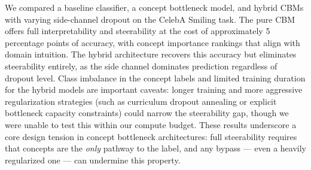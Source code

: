\documentclass[11pt,a4paper]{article}
\begin{document}
We compared a baseline classifier, a concept bottleneck model, and hybrid CBMs with varying side-channel dropout on the CelebA Smiling task. The pure CBM offers full interpretability and steerability at the cost of approximately 5 percentage points of accuracy, with concept importance rankings that align with domain intuition. The hybrid architecture recovers this accuracy but eliminates steerability entirely, as the side channel dominates prediction regardless of dropout level. Class imbalance in the concept labels and limited training duration for the hybrid models are important caveats: longer training and more aggressive regularization strategies (such as curriculum dropout annealing or explicit bottleneck capacity constraints) could narrow the steerability gap, though we were unable to test this within our compute budget. These results underscore a core design tension in concept bottleneck architectures: full steerability requires that concepts are the \emph{only} pathway to the label, and any bypass --- even a heavily regularized one --- can undermine this property.
\end{document}
